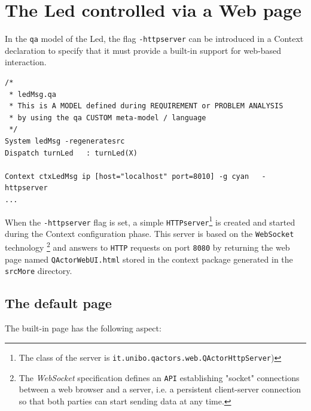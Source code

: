 \newpage 
\section{The Led controlled via a Web page}
In the \texttt{qa} model of the Led, the flag \texttt{-httpserver} can be introduced in a Context declaration to specify that it must provide a built-in support for web-based interaction. 

\lstset{language=ddr}
\begin{lstlisting}
/*
 * ledMsg.qa
 * This is A MODEL defined during REQUIREMENT or PROBLEM ANALYSIS 
 * by using the qa CUSTOM meta-model / language
 */       
System ledMsg -regeneratesrc      
Dispatch turnLed   : turnLed(X)

Context ctxLedMsg ip [host="localhost" port=8010] -g cyan   -httpserver
...
\end{lstlisting}
\lstset{language=java}

When the \texttt{-httpserver} flag is set, a simple \texttt{HTTPserver}\footnote{The class of the server is \texttt{it.unibo.qactors.web.QActorHttpServer})}  is created and started during the Context configuration phase. This server  is based on the \texttt{WebSocket} technology \footnote{The \textit{WebSocket} specification defines an \texttt{API} establishing "socket" connections between a web browser and a server, i.e. a persistent client-server connection so that  both parties can start sending data at any time.} and answers to \texttt{HTTP} requests on port \texttt{8080} by returning the web page named \texttt{QActorWebUI.html} stored in the context package generated in the \texttt{srcMore} directory. 

\subsection{The default page} 
The built-in page has the following aspect:

